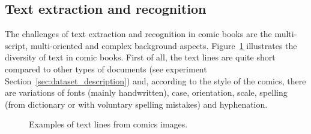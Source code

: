 



\subsection{Text extraction and recognition}
\label{sec:sota:text}


The challenges of text extraction and recognition in comic books are the multi-script, multi-oriented and complex background aspects.
Figure~\ref{fig:in:texlines_example} illustrates the diversity of text in comic books.
First of all, the text lines are quite short compared to other types of documents (see experiment Section~\ref{sec:dataset_description}) and, according to the style of the comics, there are variations of fonts (mainly handwritten), case, orientation, scale, spelling (from dictionary or with voluntary spelling mistakes) and hyphenation.


 \begin{figure}[!ht]  %
   \centering
  \caption[Examples of text lines from comics images]{Examples of text lines from comics images.}
  \label{fig:in:texlines_example}
 \end{figure}

